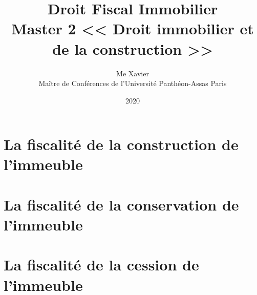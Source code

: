 \documentclass[10pt,a4paper,twoside]{book}
\author{%
Me Xavier \nom{Badin}\\%
Maître de Conférences de l’Université Panthéon-Assas Paris \II
}
\title{%
Droit Fiscal Immobilier \\
Master 2 << Droit immobilier et de la construction >>}
\date{2020}
\begin{document}
	\maketitle

	

	\part{La fiscalité de la construction de l’immeuble}

		
		
		

	\part{La fiscalité de la conservation  de l’immeuble}

		
		
		
		
		
		

	\part{La fiscalité de la cession  de l’immeuble}

		
		

	\tableofcontents
\end{document}
